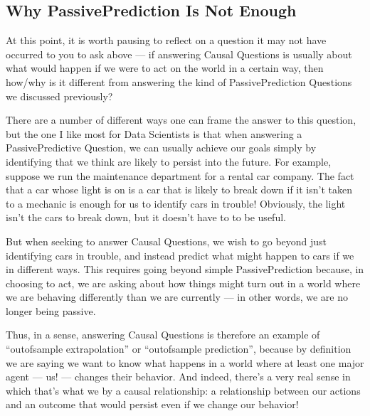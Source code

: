 \documentclass[letterpaper,10pt,english]{jupyterBook}
\begin{document}
\subsection{Why Passive\sphinxhyphen{}Prediction Is Not Enough}
\label{\detokenize{30_questions/40_answering_causal_questions:why-passive-prediction-is-not-enough}}
\sphinxAtStartPar
At this point, it is worth pausing to reflect on a question it may not have occurred to you to ask above — if answering Causal Questions is usually about  what would happen if we were to act on the world in a certain way, then how/why is it different from answering the kind of Passive\sphinxhyphen{}Prediction Questions we discussed previously?

\sphinxAtStartPar
There are a number of different ways one can frame the answer to this question, but the one I like most for Data Scientists is that  when answering a Passive\sphinxhyphen{}Predictive Question, we can usually achieve our goals simply by identifying  that we think are likely to persist into the future. For example, suppose we run the maintenance department for a rental car company. The fact that a car whose  light is on is a car that is likely to break down if it isn’t taken to a mechanic is enough for us to identify cars in trouble! Obviously, the  light isn’t  the cars to break down, but it doesn’t have to to be useful.

\sphinxAtStartPar
But when seeking to answer Causal Questions, we wish to go beyond just identifying cars in trouble, and instead predict what might happen to cars if we  in different ways. This requires going beyond simple Passive\sphinxhyphen{}Prediction because, in choosing to act, we are asking about how things might turn out in a world where we are behaving differently than we are currently — in other words, we are no longer being passive.

\sphinxAtStartPar
Thus, in a sense, answering Causal Questions is therefore  an example of “out\sphinxhyphen{}of\sphinxhyphen{}sample extrapolation” or “out\sphinxhyphen{}of\sphinxhyphen{}sample prediction”, because by definition we are saying we want to know what happens in a world where at least one major agent — us! — changes their behavior. And indeed, there’s a very real sense in which that’s what we  by a causal relationship: a relationship between our actions and an outcome that would persist even if we change our behavior!
\end{document}
